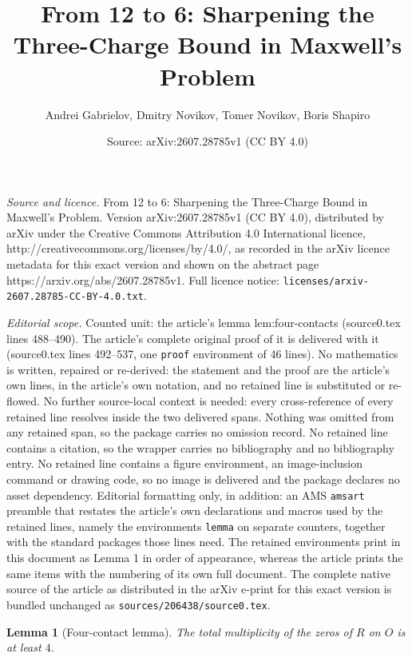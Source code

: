 \documentclass[10pt,a4paper]{amsart}
\title{From 12 to 6: Sharpening the Three-Charge Bound in Maxwell's Problem}
\author{Andrei Gabrielov, Dmitry Novikov, Tomer Novikov, Boris Shapiro}
\date{Source: arXiv:2607.28785v1 (CC BY 4.0)}
\newtheorem{lemma}{Lemma}
\begin{document}
\maketitle

\noindent\emph{Source and licence.} From 12 to 6: Sharpening the Three-Charge Bound in Maxwell's Problem. Version arXiv:2607.28785v1 (CC BY 4.0), distributed by arXiv under the Creative Commons Attribution 4.0 International licence, http://creativecommons.org/licenses/by/4.0/, as recorded in the arXiv licence metadata for this exact version and shown on the abstract page https://arxiv.org/abs/2607.28785v1. Full licence notice: \texttt{licenses/arxiv-2607.28785-CC-BY-4.0.txt}.\par\smallskip

\noindent\textit{Editorial scope.} Counted unit: the article's lemma lem:four-contacts (source0.tex lines 488--490). The article's complete original proof of it is delivered with it (source0.tex lines 492--537, one \texttt{proof} environment of 46 lines). No mathematics is written, repaired or re-derived: the statement and the proof are the article's own lines, in the article's own notation, and no retained line is substituted or re-flowed.  No further source-local context is needed: every cross-reference of every retained line resolves inside the two delivered spans.  Nothing was omitted from any retained span, so the package carries no omission record.  No retained line contains a citation, so the wrapper carries no bibliography and no bibliography entry.  No retained line contains a figure environment, an image-inclusion command or drawing code, so no image is delivered and the package declares no asset dependency.  Editorial formatting only, in addition: an AMS \texttt{amsart} preamble that restates the article's own declarations and macros used by the retained lines, namely the environments \texttt{lemma} on separate counters, together with the standard packages those lines need.  The retained environments print in this document as Lemma 1 in order of appearance, whereas the article prints the same items with the numbering of its own full document.  The complete native source of the article as distributed in the arXiv e-print for this exact version is bundled unchanged as \texttt{sources/206438/source0.tex}.
\begin{lemma}[Four-contact lemma]\label{lem:four-contacts}
The total multiplicity of the zeros of $R$ on $O$ is at least $4$.
\end{lemma}
\end{document}
